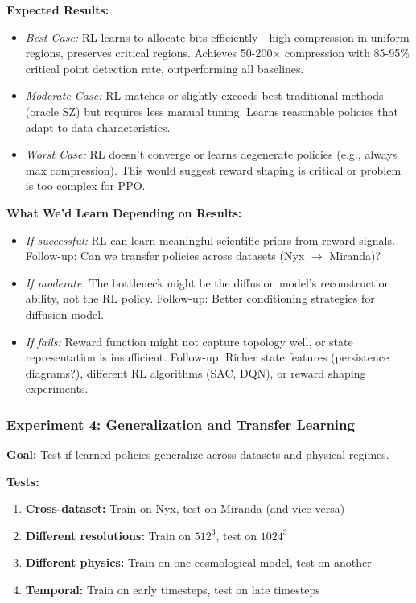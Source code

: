 \documentclass[11pt]{article}
\begin{document}
\textbf{Expected Results:}
\begin{itemize}
    \item \textit{Best Case:} RL learns to allocate bits efficiently—high compression in uniform regions, preserves critical regions. Achieves 50-200$\times$ compression with 85-95\% critical point detection rate, outperforming all baselines.

    \item \textit{Moderate Case:} RL matches or slightly exceeds best traditional methods (oracle SZ) but requires less manual tuning. Learns reasonable policies that adapt to data characteristics.

    \item \textit{Worst Case:} RL doesn't converge or learns degenerate policies (e.g., always max compression). This would suggest reward shaping is critical or problem is too complex for PPO.
\end{itemize}

\textbf{What We'd Learn Depending on Results:}

\begin{itemize}
    \item \textit{If successful:} RL can learn meaningful scientific priors from reward signals. Follow-up: Can we transfer policies across datasets (Nyx $\to$ Miranda)?

    \item \textit{If moderate:} The bottleneck might be the diffusion model's reconstruction ability, not the RL policy. Follow-up: Better conditioning strategies for diffusion model.

    \item \textit{If fails:} Reward function might not capture topology well, or state representation is insufficient. Follow-up: Richer state features (persistence diagrams?), different RL algorithms (SAC, DQN), or reward shaping experiments.
\end{itemize}

\subsubsection{Experiment 4: Generalization and Transfer Learning}

\textbf{Goal:} Test if learned policies generalize across datasets and physical regimes.

\textbf{Tests:}
\begin{enumerate}
    \item \textbf{Cross-dataset:} Train on Nyx, test on Miranda (and vice versa)
    \item \textbf{Different resolutions:} Train on $512^3$, test on $1024^3$
    \item \textbf{Different physics:} Train on one cosmological model, test on another
    \item \textbf{Temporal:} Train on early timesteps, test on late timesteps
\end{enumerate}
\end{document}
